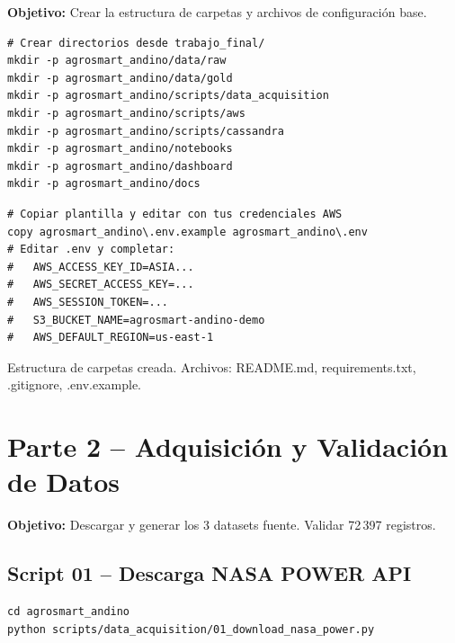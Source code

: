 \documentclass[11pt,a4paper]{article}
\begin{document}
\textbf{Objetivo:} Crear la estructura de carpetas y archivos de configuraci\'on base.

\begin{localbox}
\begin{lstlisting}[style=bash]
# Crear directorios desde trabajo_final/
mkdir -p agrosmart_andino/data/raw
mkdir -p agrosmart_andino/data/gold
mkdir -p agrosmart_andino/scripts/data_acquisition
mkdir -p agrosmart_andino/scripts/aws
mkdir -p agrosmart_andino/scripts/cassandra
mkdir -p agrosmart_andino/notebooks
mkdir -p agrosmart_andino/dashboard
mkdir -p agrosmart_andino/docs
\end{lstlisting}
\end{localbox}

\begin{localbox}
\begin{lstlisting}[style=bash]
# Copiar plantilla y editar con tus credenciales AWS
copy agrosmart_andino\.env.example agrosmart_andino\.env
# Editar .env y completar:
#   AWS_ACCESS_KEY_ID=ASIA...
#   AWS_SECRET_ACCESS_KEY=...
#   AWS_SESSION_TOKEN=...
#   S3_BUCKET_NAME=agrosmart-andino-demo
#   AWS_DEFAULT_REGION=us-east-1
\end{lstlisting}
\end{localbox}

\begin{okbox}
Estructura de carpetas creada. Archivos: README.md, requirements.txt, .gitignore, .env.example.
\end{okbox}

\section{Parte 2 -- Adquisici\'on y Validaci\'on de Datos}

\textbf{Objetivo:} Descargar y generar los 3 datasets fuente. Validar 72\,397 registros.

\subsection{Script 01 -- Descarga NASA POWER API}

\begin{localbox}
\begin{lstlisting}[style=bash]
cd agrosmart_andino
python scripts/data_acquisition/01_download_nasa_power.py
\end{lstlisting}
\end{localbox}
\end{document}
